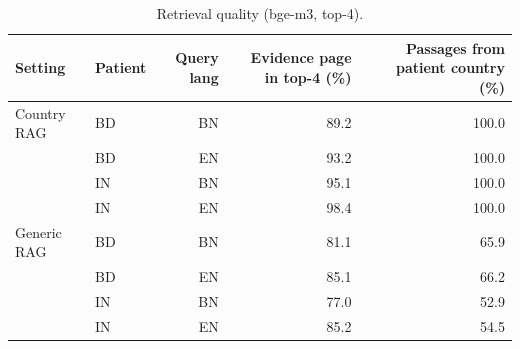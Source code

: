 \begin{table}[t]
\centering
\footnotesize
\caption{Retrieval quality (bge-m3, top-4).}
\label{tab:retrieval}
\begin{tabular}{llrrr}
\toprule
Setting & Patient & Query lang & Evidence page in top-4 (\%) & Passages from patient country (\%) \\
\midrule
Country RAG & BD & BN & 89.2 & 100.0 \\
 & BD & EN & 93.2 & 100.0 \\
 & IN & BN & 95.1 & 100.0 \\
 & IN & EN & 98.4 & 100.0 \\
\addlinespace
Generic RAG & BD & BN & 81.1 & 65.9 \\
 & BD & EN & 85.1 & 66.2 \\
 & IN & BN & 77.0 & 52.9 \\
 & IN & EN & 85.2 & 54.5 \\
\bottomrule
\end{tabular}
\end{table}


